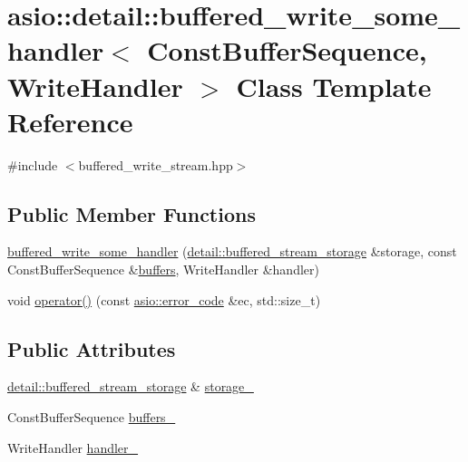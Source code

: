 \hypertarget{classasio_1_1detail_1_1buffered__write__some__handler}{}\section{asio\+:\+:detail\+:\+:buffered\+\_\+write\+\_\+some\+\_\+handler$<$ Const\+Buffer\+Sequence, Write\+Handler $>$ Class Template Reference}
\label{classasio_1_1detail_1_1buffered__write__some__handler}


{\ttfamily \#include $<$buffered\+\_\+write\+\_\+stream.\+hpp$>$}

\subsection*{Public Member Functions}
\begin{DoxyCompactItemize}
\item 
\hyperlink{classasio_1_1detail_1_1buffered__write__some__handler_af2784930fb8df930dfad9cc378b54c23}{buffered\+\_\+write\+\_\+some\+\_\+handler} (\hyperlink{classasio_1_1detail_1_1buffered__stream__storage}{detail\+::buffered\+\_\+stream\+\_\+storage} \&storage, const Const\+Buffer\+Sequence \&\hyperlink{group__async__read_ga54dede45c3175148a77fe6635222c47d}{buffers}, Write\+Handler \&handler)
\item 
void \hyperlink{classasio_1_1detail_1_1buffered__write__some__handler_a006c777b1316275f13d32a3a37be6447}{operator()} (const \hyperlink{classasio_1_1error__code}{asio\+::error\+\_\+code} \&ec, std\+::size\+\_\+t)
\end{DoxyCompactItemize}
\subsection*{Public Attributes}
\begin{DoxyCompactItemize}
\item 
\hyperlink{classasio_1_1detail_1_1buffered__stream__storage}{detail\+::buffered\+\_\+stream\+\_\+storage} \& \hyperlink{classasio_1_1detail_1_1buffered__write__some__handler_a26506a056c3ed5dc287fa2183b4e2174}{storage\+\_\+}
\item 
Const\+Buffer\+Sequence \hyperlink{classasio_1_1detail_1_1buffered__write__some__handler_a3c09e3a75a53b491cbdcaa3c3fe3f4b5}{buffers\+\_\+}
\item 
Write\+Handler \hyperlink{classasio_1_1detail_1_1buffered__write__some__handler_a8a01d41c2ea0751dd1ef511c4ceb17e6}{handler\+\_\+}
\end{DoxyCompactItemize}


